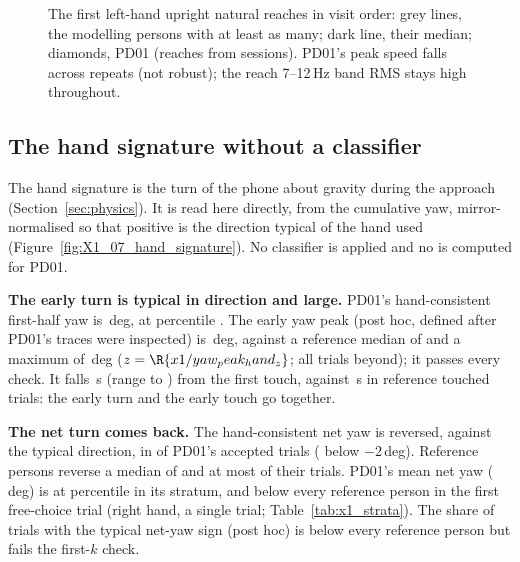 \begin{figure}[htbp]
  \centering
  \caption{The first  left-hand upright natural reaches in visit order: grey lines, the  modelling persons with at least as many; dark line, their median; diamonds, PD01 (reaches from  sessions).
    PD01's peak speed falls across repeats (not robust); the reach 7--12\,Hz band RMS stays high throughout.}
  \label{fig:X1_06_repeats}\label{fig:app:pd01-repeats}
\end{figure}

\FloatBarrier
\subsection{The hand signature without a classifier}\label{app:pd01:hand}

The hand signature is the turn of the phone about gravity during the approach (Section~\ref{sec:physics}).
It is read here directly, from the cumulative yaw, mirror-normalised so that positive is the direction typical of the hand used (Figure~\ref{fig:X1_07_hand_signature}).
No classifier is applied and no \pright{} is computed for PD01.

\textbf{The early turn is typical in direction and large.}
PD01's hand-consistent first-half yaw is \,deg, at percentile .
The early yaw peak (post hoc, defined after PD01's traces were inspected) is \,deg, against a reference median of  and a maximum of \,deg ($z = \R{x1/yaw_peak_hand_z}$; all  trials beyond); it passes every check.
It falls \,s (range  to ) from the first touch, against \,s in reference touched trials: the early turn and the early touch go together.

\textbf{The net turn comes back.}
The hand-consistent net yaw is reversed, against the typical direction, in  of PD01's  accepted trials ( below $-2$\,deg).
Reference persons reverse a median of  and at most  of their trials.
PD01's mean net yaw (\,deg) is at percentile  in its stratum, and below every reference person in the first free-choice trial (right hand, a single trial; Table~\ref{tab:x1_strata}).
The share of trials with the typical net-yaw sign (post hoc) is below every reference person but fails the first-$k$ check.

